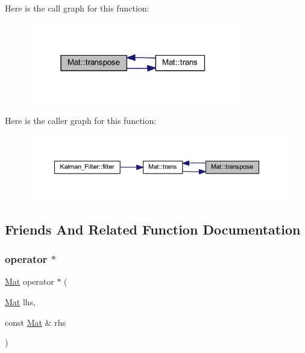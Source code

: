 Here is the call graph for this function\+:
\nopagebreak
\begin{figure}[H]
\begin{center}
\leavevmode
\includegraphics[width=259pt]{class_mat_a55e6cc33fc65042a4cff351fe59ae476_cgraph}
\end{center}
\end{figure}
Here is the caller graph for this function\+:
\nopagebreak
\begin{figure}[H]
\begin{center}
\leavevmode
\includegraphics[width=350pt]{class_mat_a55e6cc33fc65042a4cff351fe59ae476_icgraph}
\end{center}
\end{figure}


\subsection{Friends And Related Function Documentation}
\mbox{\label{class_mat_a13b58290a73861162c573130417e5e00}} 
\subsubsection{\texorpdfstring{operator $\ast$}{operator *}\hspace{0.1cm}{\footnotesize\ttfamily [1/2]}}
{\footnotesize\ttfamily \mbox{\hyperlink{class_mat}{Mat}} operator $\ast$ (\begin{DoxyParamCaption}\item[{\mbox{\hyperlink{class_mat}{Mat}}}]{lhs,  }\item[{const \mbox{\hyperlink{class_mat}{Mat}} \&}]{rhs }\end{DoxyParamCaption})\hspace{0.3cm}{\ttfamily [friend]}}



